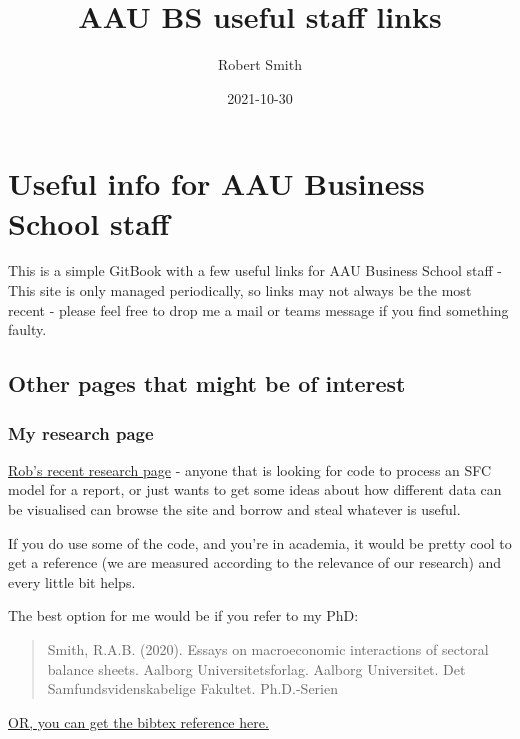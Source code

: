 \documentclass[
]{book}
\title{AAU BS useful staff links}
\author{Robert Smith}
\date{2021-10-30}
\begin{document}
\maketitle

{
\setcounter{tocdepth}{1}
\tableofcontents
}
\hypertarget{useful-info-for-aau-business-school-staff}{%
\chapter{Useful info for AAU Business School staff}\label{useful-info-for-aau-business-school-staff}}

This is a simple GitBook with a few useful links for AAU Business School staff - This site is only managed periodically, so links may not always be the most recent - please feel free to drop me a mail or teams message if you find something faulty.

\hypertarget{other-pages-that-might-be-of-interest}{%
\section{Other pages that might be of interest}\label{other-pages-that-might-be-of-interest}}

\hypertarget{my-research-page}{%
\subsection{My research page}\label{my-research-page}}

\href{https://robabsmith.github.io/research_page/}{Rob's recent research page} - anyone that is looking for code to process an SFC model for a report, or just wants to get some ideas about how different data can be visualised can browse the site and borrow and steal whatever is useful.

If you do use some of the code, and you're in academia, it would be pretty cool to get a reference (we are measured according to the relevance of our research) and every little bit helps.

The best option for me would be if you refer to my PhD:

\begin{quote}
Smith, R.A.B. (2020). Essays on macroeconomic interactions of sectoral balance sheets. Aalborg Universitetsforlag. Aalborg Universitet. Det Samfundsvidenskabelige Fakultet. Ph.D.-Serien
\end{quote}

\href{https://vbn.aau.dk/en/publications/essays-on-macroeconomic-interactions-of-sectoral-balance-sheets}{OR, you can get the bibtex reference here.}
\end{document}
